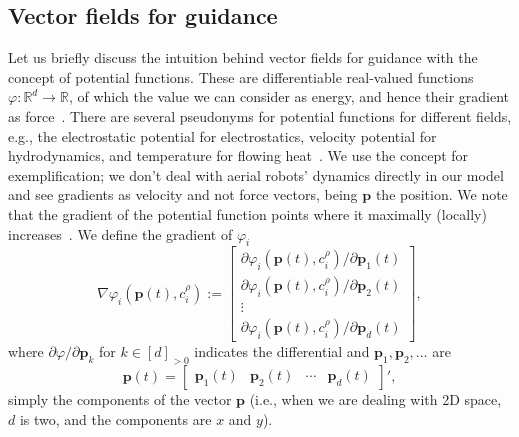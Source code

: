 \subsection{Vector fields for guidance}

Let us briefly discuss the intuition behind vector fields for guidance with the concept of potential functions. These are differentiable real-valued functions $\varphi:\mathbb{R}^d\rightarrow\mathbb{R}$, of which the value we can consider as energy, and hence their gradient as force~\citep{choset2005principles}. There are several pseudonyms for potential functions for different fields, e.g., the electrostatic potential for electrostatics, velocity potential for hydrodynamics, and temperature for flowing heat~\citep{needham1998visual,feynman2015feynman}. We use the concept for exemplification; we don't deal with aerial robots' dynamics directly in our model and see gradients as velocity and not force vectors, being $\mathbf{p}$ the position. We note that the gradient of the potential function points where it maximally (locally) increases~\citep{choset2005principles}. We define the gradient of $\varphi_i$
\begin{equation}\label{eq:grady}
  \nabla\varphi_i(\mathbf{p}(t),c^\rho_i):=\begin{bmatrix}\partial\varphi_i(\mathbf{p}(t),c^\rho_i)/\partial\mathbf{p}_1(t)\\\partial\varphi_i(\mathbf{p}(t),c^\rho_i)/\partial\mathbf{p}_2(t)\\\vdots\\\partial\varphi_i(\mathbf{p}(t),c^\rho_i)/\partial\mathbf{p}_d(t)\end{bmatrix},
\end{equation}
where $\partial\varphi/\partial\mathbf{p}_k$ for $k\in[d]_{>0}$ indicates the differential and $\mathbf{p}_1,\mathbf{p}_2,\dots$ are 
\begin{equation}
  \mathbf{p}(t)=\begin{bmatrix}
    \mathbf{p}_1(t) & \mathbf{p}_2(t) & \cdots & \mathbf{p}_d(t)
  \end{bmatrix}',
\end{equation}
simply the components of the vector $\mathbf{p}$ (i.e., when we are dealing with 2D space, $d$ is two, and the components are $x$ and $y$). 

